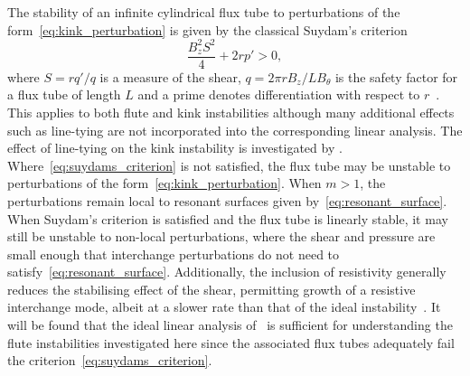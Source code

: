 \documentclass[fleqn,usenatbib]{mnras}
\newcommand{\revcite}[1]{{\color{red} \underline{#1}}}
\begin{document}
The stability of an infinite cylindrical flux tube to perturbations of the
form~\eqref{eq:kink_perturbation} is given by the classical Suydam's
criterion~\citep{suydamStabilityLinearPinch1958}
\begin{equation}
  \label{eq:suydams_criterion}
\frac{B_z^2 S^2}{4} + 2 r p' > 0,
\end{equation}
where $S = r q'/q$ is a measure of the shear, $q = 2\pi r B_z / L B_{\theta}$
is the safety factor for a flux tube of length $L$ and a prime denotes
differentiation with respect to
$r$~\citep{mikhailovskiiInstabilitiesConfinedPlasma1998}. This applies to both
flute and kink instabilities although many additional effects such as
line-tying are not incorporated into the corresponding linear analysis. The
effect of line-tying on the kink instability is investigated
by \revcite{\citet{hoodKinkInstabilitySolar1979}}. Where~\eqref{eq:suydams_criterion} is
not satisfied, the flux tube may be unstable to perturbations of the
form~\eqref{eq:kink_perturbation}. When $m>1$, the perturbations remain local
to resonant surfaces given by~\eqref{eq:resonant_surface}. When Suydam's
criterion is satisfied and the flux tube is linearly stable, it may still be
unstable to non-local perturbations, where the shear and pressure are small
enough that interchange perturbations do not need to
satisfy~\eqref{eq:resonant_surface}. Additionally, the inclusion of resistivity
generally reduces the stabilising effect of the shear, permitting growth of
a resistive interchange mode, albeit at a slower rate than that of the ideal
instability~\citep{mikhailovskiiInstabilitiesConfinedPlasma1998}. It will be
found that the ideal linear analysis
of~\cite{mikhailovskiiInstabilitiesConfinedPlasma1998} is sufficient for
understanding the flute instabilities investigated here since the associated
flux tubes adequately fail the criterion~\eqref{eq:suydams_criterion}.
\end{document}
